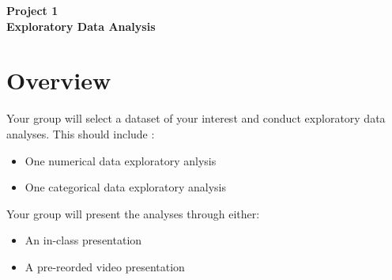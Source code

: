 \documentclass[12pt]{article}
\begin{document}
\begin{center}
\textbf{\Large Project 1 \\ Exploratory Data Analysis } 
\end{center}


\section*{Overview}
Your group will select a dataset of your interest and conduct exploratory data analyses.
This should include :
\begin{itemize}
    \item One numerical data exploratory anlysis
    \item One categorical data exploratory analysis 
\end{itemize} 
Your group will present the analyses through either:
\begin{itemize}
    \item An in-class presentation 
    \item A pre-reorded video presentation
\end{itemize}
\end{document}

